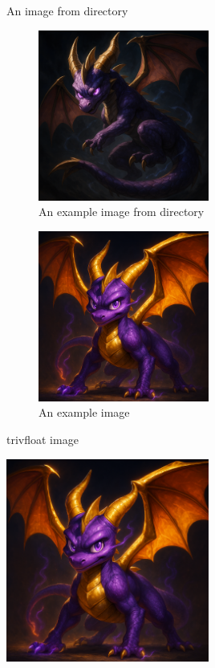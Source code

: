 \documentclass{article}
\begin{document}
An image from directory
\begin{figure}[ht]
\centering
\includegraphics[width=0.5\textwidth]{example-image_b.png}
\caption{An example image from directory}
\end{figure}


\lipsum[1-8]
\begin{figure}[H]
\centering
\includegraphics[width=0.5\textwidth]{example-image.png}
\caption{An example image}
\end{figure}
\lipsum[9-16]


trivfloat image
\begin{image}
\centering
\includegraphics[width=0.5\textwidth]{example-image.png}
\caption{An example image}
\end{image}
\end{document}

